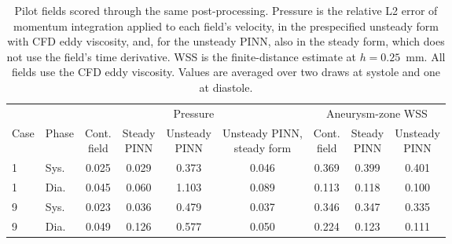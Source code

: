 \begin{table}[htbp]
\centering
\small
\caption{Pilot fields scored through the same post-processing. Pressure is the relative L2 error of momentum integration applied to each field's velocity, in the prespecified unsteady form with CFD eddy viscosity, and, for the unsteady PINN, also in the steady form, which does not use the field's time derivative. WSS is the finite-distance estimate at $h=0.25$~mm. All fields use the CFD eddy viscosity. Values are averaged over two draws at systole and one at diastole.}
\label{tab:pilot_pipeline}
\setlength{\tabcolsep}{4pt}
\begin{tabular}{llccccccc}
\toprule
 & & \multicolumn{4}{c}{Pressure} & \multicolumn{3}{c}{Aneurysm-zone WSS} \\
\cmidrule(lr){3-6}\cmidrule(lr){7-9}
Case & Phase & \shortstack{Cont.\\field} & \shortstack{Steady\\PINN} & \shortstack{Unsteady\\PINN} & \shortstack{Unsteady PINN,\\steady form} & \shortstack{Cont.\\field} & \shortstack{Steady\\PINN} & \shortstack{Unsteady\\PINN} \\
\midrule
1 & Sys. & 0.025 & 0.029 & 0.373 & 0.046 & 0.369 & 0.399 & 0.401 \\
1 & Dia. & 0.045 & 0.060 & 1.103 & 0.089 & 0.113 & 0.118 & 0.100 \\
9 & Sys. & 0.023 & 0.036 & 0.479 & 0.037 & 0.346 & 0.347 & 0.335 \\
9 & Dia. & 0.049 & 0.126 & 0.577 & 0.050 & 0.224 & 0.123 & 0.111 \\
\bottomrule
\end{tabular}
\end{table}
